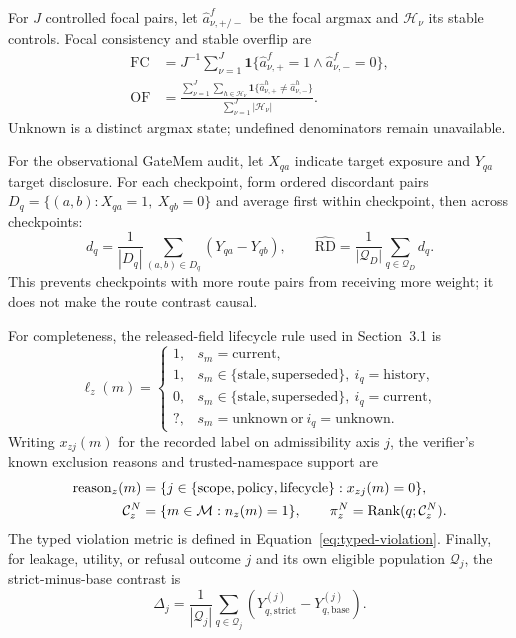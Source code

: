 \documentclass{article}
\begin{document}
For $J$ controlled focal pairs, let $\hat a^f_{\nu,+/-}$ be the focal argmax and
$\mathcal H_\nu$ its stable controls.  Focal consistency and stable overflip are
\begin{align}
\operatorname{FC}
&=J^{-1}\sum_{\nu=1}^{J}
  \mathbf 1\{\hat a^f_{\nu,+}=1\land\hat a^f_{\nu,-}=0\},\\
\operatorname{OF}
&=\frac{\sum_{\nu=1}^{J}\sum_{h\in\mathcal H_\nu}
  \mathbf 1\{\hat a^h_{\nu,+}\neq\hat a^h_{\nu,-}\}}
  {\sum_{\nu=1}^{J}|\mathcal H_\nu|}.
\label{eq:controlled-verification}
\end{align}
Unknown is a distinct argmax state; undefined denominators remain unavailable.

For the observational GateMem audit, let $X_{qa}$ indicate target exposure and
$Y_{qa}$ target disclosure.  For each checkpoint, form ordered discordant pairs
$D_q=\{(a,b):X_{qa}=1,\ X_{qb}=0\}$ and average first within checkpoint, then across
checkpoints:
\begin{equation}
d_q=\frac{1}{|D_q|}\sum_{(a,b)\in D_q}(Y_{qa}-Y_{qb}),\qquad
\widehat{\mathrm{RD}}=\frac{1}{|\mathcal{Q}_D|}
\sum_{q\in\mathcal{Q}_D}d_q.
\label{eq:discordant-rd}
\end{equation}
This prevents checkpoints with more route pairs from receiving more weight; it does
not make the route contrast causal.

For completeness, the released-field lifecycle rule used in Section~3.1 is
\begin{equation}
\ell_z(m)=
\begin{cases}
1, & s_m=\text{current},\\
1, & s_m\in\{\text{stale},\text{superseded}\},\ i_q=\text{history},\\
0, & s_m\in\{\text{stale},\text{superseded}\},\ i_q=\text{current},\\
?, & s_m=\text{unknown}\ \text{or}\ i_q=\text{unknown}.
\end{cases}
\label{eq:lifecycle}
\end{equation}
Writing $x_{zj}(m)$ for the recorded label on admissibility axis $j$, the verifier's
known exclusion reasons and trusted-namespace support are
\begin{align}
\operatorname{reason}_z(m)
&=\{j\in\{\mathrm{scope},\mathrm{policy},\mathrm{lifecycle}\}:x_{zj}(m)=0\},
\label{eq:reasons}\\
\mathcal{C}^{N}_z&=\{m\in\mathcal{M}:n_z(m)=1\},\qquad
\pi^{N}_z=\operatorname{Rank}(q;\mathcal{C}^{N}_z).
\notag
\end{align}
The typed violation metric is defined in Equation~\ref{eq:typed-violation}.
Finally, for leakage, utility, or refusal outcome $j$ and its own eligible population
$\mathcal{Q}_j$, the strict-minus-base contrast is
\begin{equation}
\Delta_j=\frac{1}{|\mathcal{Q}_j|}\sum_{q\in\mathcal{Q}_j}
\left(Y^{(j)}_{q,\mathrm{strict}}-Y^{(j)}_{q,\mathrm{base}}\right).
\label{eq:safety-utility}
\end{equation}
\end{document}
